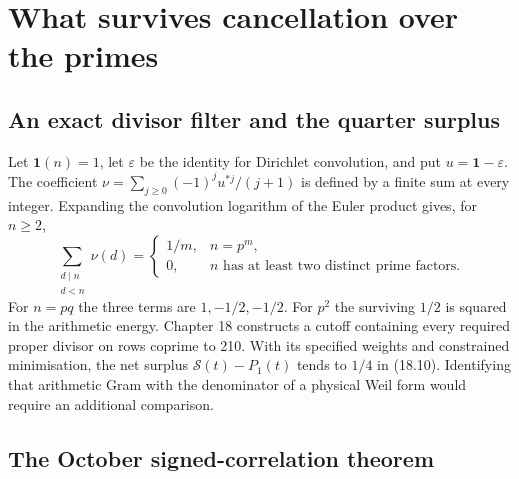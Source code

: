\documentclass[
  10pt,
  a4paper,
  10pt,
  oneside,
  openany]{book}
\begin{document}
\section{What survives cancellation over the primes}\label{atlas-primes}

\subsection{An exact divisor filter and the quarter
surplus}\label{an-exact-divisor-filter-and-the-quarter-surplus}

Let \(\mathbf1(n)=1\), let \(\varepsilon\) be the identity for Dirichlet
convolution, and put \(u=\mathbf1-\varepsilon\). The coefficient
\(\nu=\sum_{j\ge0}(-1)^ju^{*j}/(j+1)\) is defined by a finite sum at
every integer. Expanding the convolution logarithm of the Euler product
gives, for \(n\ge2\), \[
 \sum_{\substack{d\mid n\\d<n}}\nu(d)=
 \begin{cases}1/m,&n=p^m,\\0,&n\text{ has at least two distinct prime factors}.\end{cases}
 \tag{A8}\label{eq:A8}
\] For \(n=pq\) the three terms are \(1,-1/2,-1/2\). For \(p^2\) the
surviving \(1/2\) is squared in the arithmetic energy. Chapter 18
constructs a cutoff containing every required proper divisor on rows
coprime to 210. With its specified weights and constrained minimisation,
the net surplus \(\mathcal S(t)-P_1(t)\) tends to \(1/4\) in (18.10).
Identifying that arithmetic Gram with the denominator of a physical Weil
form would require an additional comparison.

\subsection{The October signed-correlation
theorem}\label{the-october-signed-correlation-theorem}
\end{document}
